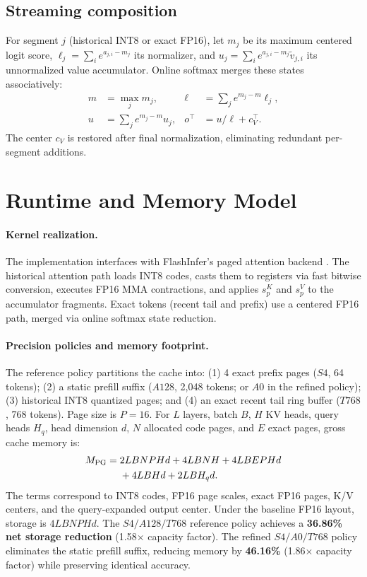 \documentclass{article}
\begin{document}
\subsection{Streaming composition}
For segment $j$ (historical INT8 or exact FP16), let $m_j$ be its maximum centered logit score, $\ell_j = \sum_i e^{a_{j,i}-m_j}$ its normalizer, and $u_j = \sum_i e^{a_{j,i}-m_j} \widetilde v_{j,i}$ its unnormalized value accumulator. Online softmax merges these states associatively:
\begin{align}
m&=\max_j m_j, & \ell&=\sum_j e^{m_j-m}\ell_j,\\
u&=\sum_j e^{m_j-m}u_j, & o^\top&=u/\ell+c_V^\top.
\end{align}
The center $c_V$ is restored after final normalization, eliminating redundant per-segment additions.

\section{Runtime and Memory Model}
\paragraph{Kernel realization.}
The implementation interfaces with FlashInfer's paged attention backend \citep{ye2025flashinfer}. The historical attention path loads INT8 codes, casts them to registers via fast bitwise conversion, executes FP16 MMA contractions, and applies $s_p^K$ and $s_p^V$ to the accumulator fragments. Exact tokens (recent tail and prefix) use a centered FP16 path, merged via online softmax state reduction.

\paragraph{Precision policies and memory footprint.}
The reference policy partitions the cache into:
(1) 4 exact prefix pages ($S4$, 64 tokens);
(2) a static prefill suffix ($A128$, 2,048 tokens; or $A0$ in the refined policy);
(3) historical INT8 quantized pages; and
(4) an exact recent tail ring buffer ($T768$, 768 tokens).
Page size is $P=16$. For $L$ layers, batch $B$, $H$ KV heads, query heads $H_q$, head dimension $d$, $N$ allocated code pages, and $E$ exact pages, gross cache memory is:
\begin{equation}
\begin{split}
M_{\rm PG}={}&2LBNPHd+4LBNH+4LBEPHd\\
&+4LBHd+2LBH_qd.
\end{split}
\label{eq:mem}
\end{equation}
The terms correspond to INT8 codes, FP16 page scales, exact FP16 pages, K/V centers, and the query-expanded output center. Under the baseline FP16 layout, storage is $4LBNPHd$. The $S4/A128/T768$ reference policy achieves a \textbf{36.86\% net storage reduction} (1.58$\times$ capacity factor). The refined $S4/A0/T768$ policy eliminates the static prefill suffix, reducing memory by \textbf{46.16\%} (1.86$\times$ capacity factor) while preserving identical accuracy.
\end{document}

